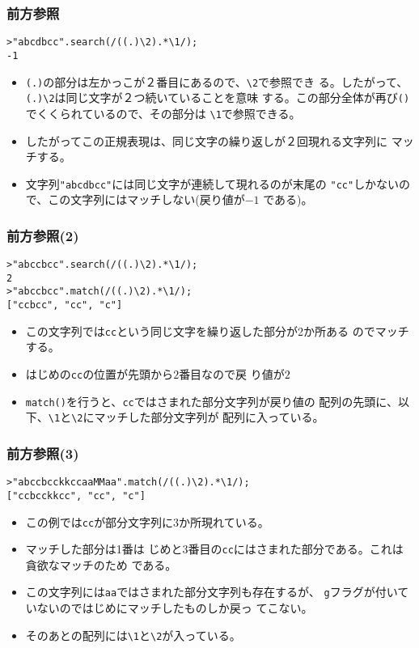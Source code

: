 \documentclass[dvipsk]{beamer}
\begin{document}
\begin{frame}[containsverbatim]
 \frametitle{前方参照}
\begin{verbatim}
>"abcdbcc".search(/((.)\2).*\1/);
-1
\end{verbatim}
\begin{itemize}
 \item \verb+(.)+の部分は左かっこが２番目にあるので、\verb+\2+で参照でき
       る。したがって、\verb+(.)\2+は同じ文字が２つ続いていることを意味
       する。この部分全体が再び\verb+()+でくくられているので、その部分は
       \verb+\1+で参照できる。
 \item したがってこの正規表現は、同じ文字の繰り返しが２回現れる文字列に
       マッチする。
 \item 文字列\verb+"abcdbcc"+には同じ文字が連続して現れるのが末尾の
       \verb+"cc"+しかないので、この文字列にはマッチしない(戻り値が$-1$
       である)。
\end{itemize}
\end{frame}
\begin{frame}[containsverbatim]
 \frametitle{前方参照(2)}
\begin{verbatim}
>"abccbcc".search(/((.)\2).*\1/);
2
>"abccbcc".match(/((.)\2).*\1/);
["ccbcc", "cc", "c"]
\end{verbatim}
\begin{itemize}
 \item この文字列では\verb+cc+という同じ文字を繰り返した部分が2か所ある
       のでマッチする。
 \item はじめの\verb+cc+の位置が先頭から$2$番目なので戻
       り値が$2$
 \item \verb+match()+を行うと、\verb+cc+ではさまれた部分文字列が戻り値の
       配列の先頭に、以下、\verb+\1+と\verb+\2+にマッチした部分文字列が
       配列に入っている。
\end{itemize}
\end{frame}
\begin{frame}[containsverbatim]
 \frametitle{前方参照(3)}
\begin{verbatim}
>"abccbcckkccaaMMaa".match(/((.)\2).*\1/);
["ccbcckkcc", "cc", "c"]
\end{verbatim}
\begin{itemize}
 \item この例では\verb+cc+が部分文字列に3か所現れている。
 \item マッチした部分は1番は
 じめと3番目の\verb+cc+にはさまれた部分である。これは貪欲なマッチのため
       である。
 \item この文字列には\verb+aa+ではさまれた部分文字列も存在するが、
       \verb+g+フラグが付いていないのではじめにマッチしたものしか戻っ
       てこない。
 \item そのあとの配列には\verb+\1+と\verb+\2+が入っている。
\end{itemize}
\end{frame}
\end{document}
